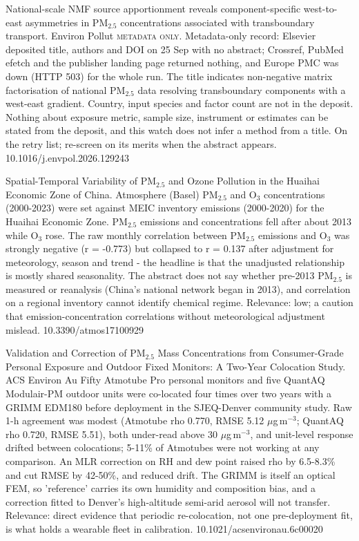 \documentclass[10pt]{article}
\begin{document}
{National-scale NMF source apportionment reveals component-specific west-to-east asymmetries in PM$_{2.5}$ concentrations associated with transboundary transport.}
{Environ Pollut}
{\textsc{metadata only.} Metadata-only record: Elsevier deposited title, authors and DOI on 25 Sep with no abstract; Crossref, PubMed efetch and the publisher landing page returned nothing, and Europe PMC was down (HTTP 503) for the whole run. The title indicates non-negative matrix factorisation of national PM$_{2.5}$ data resolving transboundary components with a west-east gradient. Country, input species and factor count are not in the deposit. Nothing about exposure metric, sample size, instrument or estimates can be stated from the deposit, and this watch does not infer a method from a title. On the retry list; re-screen on its merits when the abstract appears.}
{10.1016/j.envpol.2026.129243}

{Spatial-Temporal Variability of PM$_{2.5}$ and Ozone Pollution in the Huaihai Economic Zone of China.}
{Atmosphere (Basel)}
{PM$_{2.5}$ and O$_3$ concentrations (2000-2023) were set against MEIC inventory emissions (2000-2020) for the Huaihai Economic Zone. PM$_{2.5}$ emissions and concentrations fell after about 2013 while O$_3$ rose. The raw monthly correlation between PM$_{2.5}$ emissions and O$_3$ was strongly negative (r = -0.773) but collapsed to r = 0.137 after adjustment for meteorology, season and trend - the headline is that the unadjusted relationship is mostly shared seasonality. The abstract does not say whether pre-2013 PM$_{2.5}$ is measured or reanalysis (China's national network began in 2013), and correlation on a regional inventory cannot identify chemical regime. Relevance: low; a caution that emission-concentration correlations without meteorological adjustment mislead.}
{10.3390/atmos17100929}


{Validation and Correction of PM$_{2.5}$ Mass Concentrations from Consumer-Grade Personal Exposure and Outdoor Fixed Monitors: A Two-Year Colocation Study.}
{ACS Environ Au}
{Fifty Atmotube Pro personal monitors and five QuantAQ Modulair-PM outdoor units were co-located four times over two years with a GRIMM EDM180 before deployment in the SJEQ-Denver community study. Raw 1-h agreement was modest (Atmotube rho 0.770, RMSE 5.12 $\mu$g\,m$^{-3}$; QuantAQ rho 0.720, RMSE 5.51), both under-read above 30 $\mu$g\,m$^{-3}$, and unit-level response drifted between colocations; 5-11\% of Atmotubes were not working at any comparison. An MLR correction on RH and dew point raised rho by 6.5-8.3\% and cut RMSE by 42-50\%, and reduced drift. The GRIMM is itself an optical FEM, so 'reference' carries its own humidity and composition bias, and a correction fitted to Denver's high-altitude semi-arid aerosol will not transfer. Relevance: direct evidence that periodic re-colocation, not one pre-deployment fit, is what holds a wearable fleet in calibration.}
{10.1021/acsenvironau.6c00020}
\end{document}
